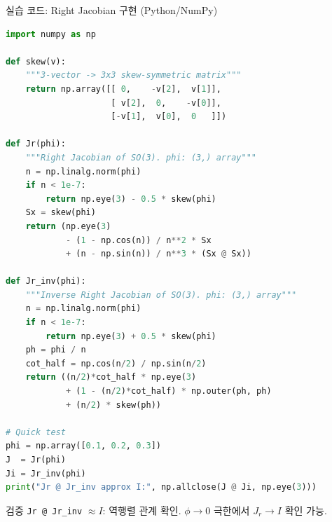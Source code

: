 \begin{frame}[fragile, shrink=50]{실습 코드: Right Jacobian 구현 (Python/NumPy)}
  \begin{lstlisting}[language=Python, basicstyle=\footnotesize\ttfamily,
      keywordstyle=\color{blue}, commentstyle=\color{gray}]
import numpy as np

def skew(v):
    """3-vector -> 3x3 skew-symmetric matrix"""
    return np.array([[ 0,    -v[2],  v[1]],
                     [ v[2],  0,    -v[0]],
                     [-v[1],  v[0],  0   ]])

def Jr(phi):
    """Right Jacobian of SO(3). phi: (3,) array"""
    n = np.linalg.norm(phi)
    if n < 1e-7:
        return np.eye(3) - 0.5 * skew(phi)
    Sx = skew(phi)
    return (np.eye(3)
            - (1 - np.cos(n)) / n**2 * Sx
            + (n - np.sin(n)) / n**3 * (Sx @ Sx))

def Jr_inv(phi):
    """Inverse Right Jacobian of SO(3). phi: (3,) array"""
    n = np.linalg.norm(phi)
    if n < 1e-7:
        return np.eye(3) + 0.5 * skew(phi)
    ph = phi / n
    cot_half = np.cos(n/2) / np.sin(n/2)
    return ((n/2)*cot_half * np.eye(3)
            + (1 - (n/2)*cot_half) * np.outer(ph, ph)
            + (n/2) * skew(ph))

# Quick test
phi = np.array([0.1, 0.2, 0.3])
J  = Jr(phi)
Ji = Jr_inv(phi)
print("Jr @ Jr_inv approx I:", np.allclose(J @ Ji, np.eye(3)))
  \end{lstlisting}
  \begin{exampleblock}{\small 검증}
    \footnotesize \texttt{Jr @ Jr\_inv} $\approx I$: 역행렬 관계 확인. $\phi\to 0$ 극한에서 $J_r \to I$ 확인 가능.
  \end{exampleblock}
\end{frame}


